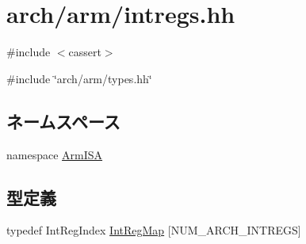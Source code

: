 \hypertarget{intregs_8hh}{
\section{arch/arm/intregs.hh}
\label{intregs_8hh}
}
{\ttfamily \#include $<$cassert$>$}\par
{\ttfamily \#include \char`\"{}arch/arm/types.hh\char`\"{}}\par
\subsection*{ネームスペース}
\begin{DoxyCompactItemize}
\item 
namespace \hyperlink{namespaceArmISA}{ArmISA}
\end{DoxyCompactItemize}
\subsection*{型定義}
\begin{DoxyCompactItemize}
\item 
typedef IntRegIndex \hyperlink{namespaceArmISA_ab4ab6998399c691bd8a2c08da4d2b1ed}{IntRegMap} \mbox{[}NUM\_\-ARCH\_\-INTREGS\mbox{]}
\end{DoxyCompactItemize}
